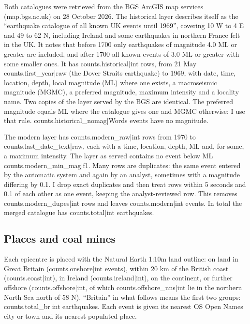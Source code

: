 \documentclass[11pt,a4paper]{article}
\begin{document}
Both catalogues were retrieved from the BGS ArcGIS map services (map.bgs.ac.uk) on 28 October 2026. The historical layer describes itself as the ``earthquake catalogue of all known UK events until 1969'', covering 10\textdegree{} W to 4\textdegree{} E and 49\textdegree{} to 62\textdegree{} N, including Ireland and some earthquakes in northern France felt in the UK. It notes that before 1700 only earthquakes of magnitude 4.0 ML or greater are included, and after 1700 all known events of 3.0 ML or greater with some smaller ones. It has {{counts.historical|int}} rows, from 21 May {{counts.first_year|raw}} (the Dover Straits earthquake) to 1969, with date, time, location, depth, local magnitude (ML) where one exists, a macroseismic magnitude (MGMC), a preferred magnitude, maximum intensity and a locality name. Two copies of the layer served by the BGS are identical. The preferred magnitude equals ML where the catalogue gives one and MGMC otherwise; I use that rule. {{counts.historical_nomag|Words}} events have no magnitude.

The modern layer has {{counts.modern_raw|int}} rows from 1970 to {{counts.last_date_text|raw}}, each with a time, location, depth, ML and, for some, a maximum intensity. The layer as served contains no event below ML {{counts.modern_min_mag|f1}}. Many rows are duplicates: the same event entered by the automatic system and again by an analyst, sometimes with a magnitude differing by 0.1. I drop exact duplicates and then treat rows within 5 seconds and 0.1\textdegree{} of each other as one event, keeping the analyst-reviewed row. This removes {{counts.modern_dupes|int}} rows and leaves {{counts.modern|int}} events. In total the merged catalogue has {{counts.total|int}} earthquakes.

\subsection{Places and coal mines}

Each epicentre is placed with the Natural Earth 1:10m land outline: on land in Great Britain ({{counts.onshore|int}} events), within 20 km of the British coast ({{counts.coast|int}}), in Ireland ({{counts.ireland|int}}), on the continent, or further offshore ({{counts.offshore|int}}, of which {{counts.offshore_nns|int}} lie in the northern North Sea north of 58\textdegree{} N). ``Britain'' in what follows means the first two groups: {{counts.total_br|int}} earthquakes. Each event is given its nearest OS Open Names city or town and its nearest populated place.
\end{document}
